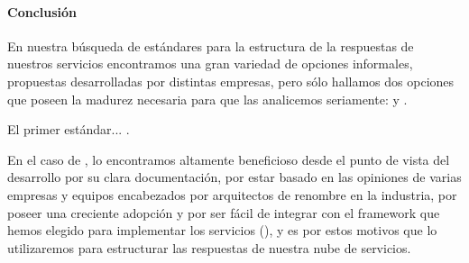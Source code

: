 \paragraph{Conclusión}

En nuestra búsqueda de estándares para la estructura de la respuestas de nuestros servicios encontramos una gran variedad de opciones informales, propuestas desarrolladas por distintas empresas, pero sólo hallamos dos opciones que poseen la madurez necesaria para que las analicemos seriamente:  y .

El primer estándar... .

En el caso de , lo encontramos altamente beneficioso desde el punto de vista del desarrollo por su clara documentación, por estar basado en las opiniones de varias empresas y equipos encabezados por arquitectos de renombre en la industria, por poseer una creciente adopción y por ser fácil de integrar con el framework que hemos elegido para implementar los servicios (), y es por estos motivos que lo utilizaremos para estructurar las respuestas de nuestra nube de servicios.
